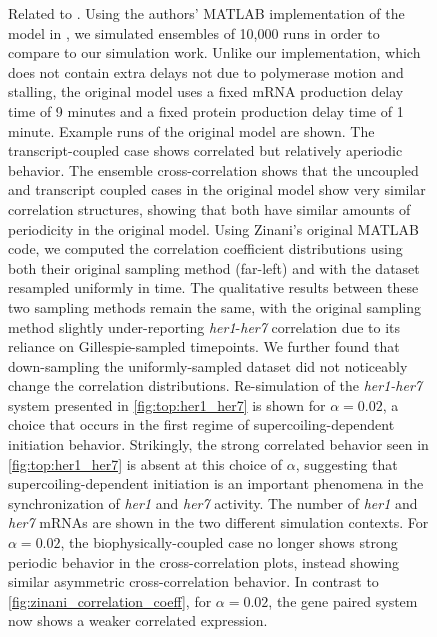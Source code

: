 \documentclass[11pt]{article} %
\begin{document}
\begin{figure}[htbp]
    \ContinuedFloat
    \caption{Related to .
        Using the authors' MATLAB implementation of the model in \textcite{zinaniPairingSegmentationClock2021}, we simulated ensembles of 10,000 runs in order to compare to our simulation work. Unlike our implementation, which does not contain extra delays not due to polymerase motion and stalling, the original model uses a fixed mRNA production delay time of 9 minutes and a fixed protein production delay time of 1 minute. Example runs of the original model are shown. The transcript-coupled case shows correlated but relatively aperiodic behavior.
         The ensemble cross-correlation shows that the uncoupled and transcript coupled cases in the original model show very similar correlation structures, showing that both have similar amounts of periodicity in the original model.
         Using Zinani's original MATLAB code, we computed the correlation coefficient distributions using both their original sampling method (far-left) and with the dataset resampled uniformly in time. The qualitative results between these two sampling methods remain the same, with the original sampling method slightly under-reporting \textit{her1}-\textit{her7} correlation due to its reliance on Gillespie-sampled timepoints. We further found that down-sampling the uniformly-sampled dataset did not noticeably change the correlation distributions.
        Re-simulation of the \textit{her1-her7} system presented in \cref{fig:top:her1_her7} is shown for \(\alpha = 0.02\), a choice that occurs in the first regime of supercoiling-dependent initiation behavior. Strikingly, the strong correlated behavior seen in \cref{fig:top:her1_her7} is absent at this choice of \(\alpha\), suggesting that supercoiling-dependent initiation is an important phenomena in the synchronization of \textit{her1} and \textit{her7} activity.
         The number of \textit{her1} and \textit{her7} mRNAs are shown in the two different simulation contexts.
         For \(\alpha = 0.02\), the biophysically-coupled case no longer shows strong periodic behavior in the cross-correlation plots, instead showing similar asymmetric cross-correlation behavior.
         In contrast to \cref{fig:zinani_correlation_coeff}, for \(\alpha = 0.02\), the gene paired system now shows a weaker correlated expression.
}
\end{figure}
\end{document}
